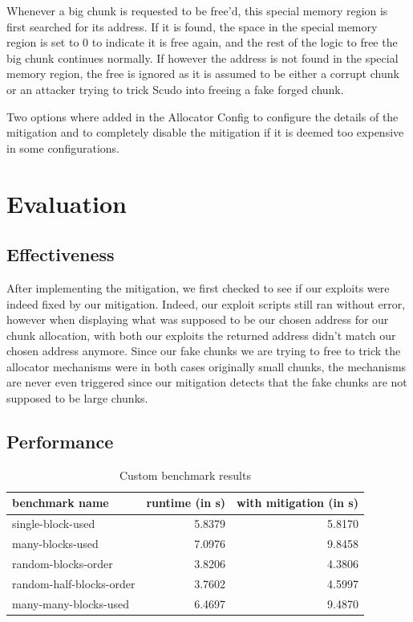 \documentclass[a4paper,11pt,oneside]{report}
\begin{document}
Whenever a big chunk is requested to be free'd, this special memory region is first
searched for its address. If it is found, the space in the special memory region is set to
0 to indicate it is free again, and the rest of the logic to free the big chunk continues
normally. If however the address is not found in the special memory region, the free is
ignored as it is assumed to be either a corrupt chunk or an attacker trying to trick Scudo
into freeing a fake forged chunk.

Two options where added in the Allocator Config to configure the details of the mitigation
and to completely disable the mitigation if it is deemed too expensive in some
configurations.

\section{Evaluation}

\subsection{Effectiveness}

After implementing the mitigation, we first checked to see if our exploits were indeed
fixed by our mitigation. Indeed, our exploit scripts still ran without error, however when
displaying what was supposed to be our chosen address for our chunk allocation, with both
our exploits the returned address didn't match our chosen address anymore. Since our fake
chunks we are trying to free to trick the allocator mechanisms were in both cases
originally small chunks, the mechanisms are never even triggered since our mitigation
detects that the fake chunks are not supposed to be large chunks.

\subsection{Performance}

\begin{longtable}[h]{l r r}
  \caption{Custom benchmark results}\label{tab:CustomBenchmark} \\
  
  \toprule
  benchmark name           & runtime (in s) & with mitigation (in s) \\
  \midrule
  \endhead{}
  single-block-used        & 5.8379         & 5.8170                 \\
  \midrule
  many-blocks-used         & 7.0976         & 9.8458                 \\
  \midrule
  random-blocks-order      & 3.8206         & 4.3806                 \\
  \midrule
  random-half-blocks-order & 3.7602         & 4.5997                 \\
  \midrule
  many-many-blocks-used    & 6.4697         & 9.4870                 \\
  \bottomrule
\end{longtable}
\end{document}
